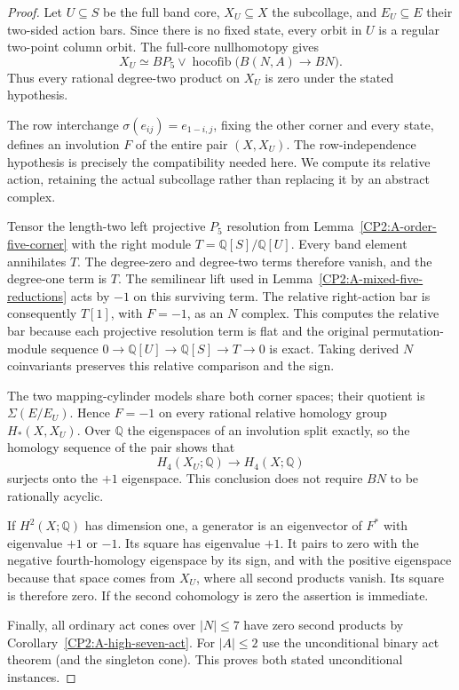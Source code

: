 \begin{proof}
Let $U\subseteq S$ be the full band core, $X_U\subseteq X$
the subcollage, and $E_U\subseteq E$ their two-sided
action bars. Since there is no fixed state, every orbit
in $U$ is a regular two-point column orbit.
The full-core nullhomotopy gives
\[
 X_U\simeq BP_5\vee
 \operatorname{hocofib}\bigl(B(N,A)\longrightarrow BN\bigr).
\]
Thus every rational degree-two product on $X_U$ is zero
under the stated hypothesis.

The row interchange $\sigma(e_{ij})=e_{1-i,j}$, fixing
the other corner and every state, defines an involution
$F$ of the entire pair $(X,X_U)$. The row-independence
hypothesis is precisely the compatibility needed here.
We compute its relative action, retaining the actual
subcollage rather than replacing it by an abstract complex.

Tensor the length-two left projective $P_5$ resolution
from Lemma~\ref{CP2:A-order-five-corner} with the right
module $T=\mathbb Q[S]/\mathbb Q[U]$.
Every band element annihilates $T$. The degree-zero and
degree-two terms therefore vanish, and the degree-one
term is $T$. The semilinear lift used in
Lemma~\ref{CP2:A-mixed-five-reductions} acts by $-1$
on this surviving term. The relative right-action bar
is consequently $T[1]$, with $F=-1$, as an $N$ complex.
This computes the relative bar because each projective
resolution term is flat and the original permutation-module
sequence $0\to\mathbb Q[U]\to\mathbb Q[S]\to T\to0$
is exact. Taking derived $N$ coinvariants preserves this
relative comparison and the sign.

The two mapping-cylinder models share both corner spaces;
their quotient is $\Sigma(E/E_U)$. Hence $F=-1$ on
every rational relative homology group $H_*(X,X_U)$.
Over $\mathbb Q$ the eigenspaces of an involution split
exactly, so the homology sequence of the pair shows that
\[
 H_4(X_U;\mathbb Q)\longrightarrow H_4(X;\mathbb Q)
\]
surjects onto the $+1$ eigenspace. This conclusion does
not require $BN$ to be rationally acyclic.

If $H^2(X;\mathbb Q)$ has dimension one, a generator is
an eigenvector of $F^*$ with eigenvalue $+1$ or $-1$.
Its square has eigenvalue $+1$. It pairs to zero with
the negative fourth-homology eigenspace by its sign, and
with the positive eigenspace because that space comes
from $X_U$, where all second products vanish.
Its square is therefore zero. If the second cohomology
is zero the assertion is immediate.

Finally, all ordinary act cones over $|N|\le7$ have zero
second products by Corollary~\ref{CP2:A-high-seven-act}.
For $|A|\le2$ use the unconditional binary act theorem
(and the singleton cone). This proves both stated
unconditional instances.
\end{proof}

